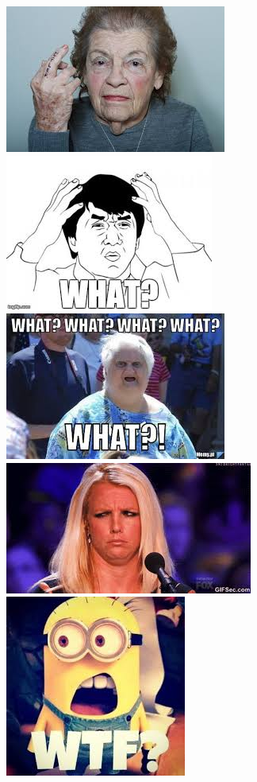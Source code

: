 \documentclass{42}
\begin{document}
    \begin{center}
        \includegraphics[scale=0.35]{what1}
	    \includegraphics[scale=0.35]{what2}
	    \includegraphics[scale=0.35]{what3}
	    \includegraphics[scale=0.35]{what4}
	    \includegraphics[scale=0.35]{what5}

\end{center}
\end{document}
